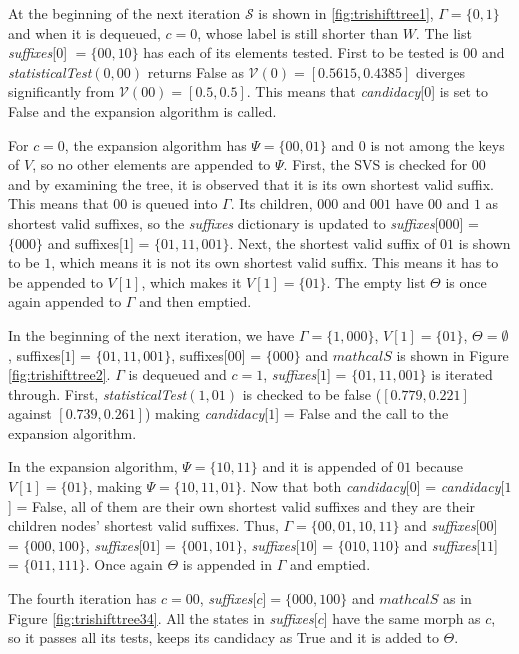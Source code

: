 {At the beginning of the next iteration $\mathcal{S}$ is shown in \ref{fig:trishifttree1}, $\Gamma = \{0, 1\}$ and when it is dequeued, $c = 0$, whose label is still shorter than $W$. The list \textit{suffixes}[$0$] $= \{00, 10\}$ has each of its elements tested. First to be tested is $00$ and \textit{statisticalTest}$(0,00)$ returns False as $\mathcal{V}(0) = [0.5615, 0.4385]$ diverges significantly from $\mathcal{V}(00) = [0.5, 0.5]$. This means that \textit{candidacy}[$0$] is set to False and the expansion algorithm is called.

For $c = 0$, the expansion algorithm has $\Psi = \{00, 01\}$ and $0$ is not among the keys of $V$, so no other elements are appended to $\Psi$. First, the SVS is checked for $00$ and by examining the tree, it is observed that it is its own shortest valid suffix. This means that $00$ is queued into $\Gamma$. Its children, $000$ and $001$ have $00$ and $1$ as shortest valid suffixes, so the \textit{suffixes} dictionary is updated to \textit{suffixes}[$000$] = $\{000\}$ and suffixes[$1$] = $\{01, 11, 001\}$. Next, the shortest valid suffix of $01$ is shown to be $1$, which means it is not its own shortest valid suffix. This means it has to be appended to $V[1]$, which makes it $V[1] = \{01\}$. The empty list $\Theta$ is once again appended to $\Gamma$ and then emptied. 

In the beginning of the next iteration, we have $\Gamma = \{1, 000\}$, $V[1] = \{01\}$, $\Theta = \emptyset$, suffixes[$1$] = $\{01, 11, 001\}$, suffixes[$00$] = $\{000\}$ and $mathcal{S}$  is shown in Figure \ref{fig:trishifttree2}. $\Gamma$ is dequeued and $c = 1$, \textit{suffixes}[$1$] = $\{01, 11, 001\}$ is iterated through. First, \textit{statisticalTest}$(1,01)$ is checked to be false ($[0.779, 0.221]$ against $[0.739, 0.261]$) making \textit{candidacy}[$1$] = False and the call to the expansion algorithm.

In the expansion algorithm, $\Psi = \{10, 11\}$ and it is appended of $01$ because $V[1] = \{01\}$, making $\Psi = \{10, 11, 01\}$. Now that both \textit{candidacy}[$0$] = \textit{candidacy}[$1$] = False, all of them are their own shortest valid suffixes and they are their children nodes' shortest valid suffixes. Thus, $\Gamma = \{00, 01, 10, 11\}$ and \textit{suffixes}[$00$] = $\{000, 100\}$, \textit{suffixes}[$01$] = $\{001, 101\}$, \textit{suffixes}[$10$] = $\{010, 110\}$ and \textit{suffixes}[$11$] = $\{011, 111\}$. Once again $\Theta$ is appended in $\Gamma$ and emptied.

The fourth iteration has $c = 00$, \textit{suffixes}[$c$]$ = \{000, 100\}$ and $mathcal{S}$ as in Figure \ref{fig:trishifttree34}. All the states in \textit{suffixes}[$c$] have the same morph as $c$, so it passes all its tests, keeps its candidacy as True and it is added to $\Theta$.

}
